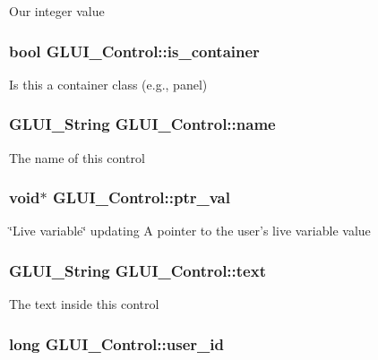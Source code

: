 Our integer value \hypertarget{classGLUI__Control_ac667bec4efbc9bdbf3e246b4471fb4cb}{
\subsubsection[{is\-\_\-container}]{\setlength{\rightskip}{0pt plus 5cm}bool G\-L\-U\-I\-\_\-\-Control\-::is\-\_\-container}}\label{classGLUI__Control_ac667bec4efbc9bdbf3e246b4471fb4cb}
Is this a container class (e.\-g., panel) \hypertarget{classGLUI__Control_aa95b97d50df45335fc33f0af03958eb3}{
\subsubsection[{name}]{\setlength{\rightskip}{0pt plus 5cm}G\-L\-U\-I\-\_\-\-String G\-L\-U\-I\-\_\-\-Control\-::name}}\label{classGLUI__Control_aa95b97d50df45335fc33f0af03958eb3}
The name of this control \hypertarget{classGLUI__Control_a0890ea809b8d980695939e1d92a0af47}{
\subsubsection[{ptr\-\_\-val}]{\setlength{\rightskip}{0pt plus 5cm}void$\ast$ G\-L\-U\-I\-\_\-\-Control\-::ptr\-\_\-val}}\label{classGLUI__Control_a0890ea809b8d980695939e1d92a0af47}
\char`\"{}\-Live variable\char`\"{} updating A pointer to the user's live variable value \hypertarget{classGLUI__Control_af0d60e9736f4dbc34e9a536e75876d72}{
\subsubsection[{text}]{\setlength{\rightskip}{0pt plus 5cm}G\-L\-U\-I\-\_\-\-String G\-L\-U\-I\-\_\-\-Control\-::text}}\label{classGLUI__Control_af0d60e9736f4dbc34e9a536e75876d72}
The text inside this control \hypertarget{classGLUI__Control_a6c88b7c72b0800f88a5d4cda4868c8b6}{
\subsubsection[{user\-\_\-id}]{\setlength{\rightskip}{0pt plus 5cm}long G\-L\-U\-I\-\_\-\-Control\-::user\-\_\-id}}\label{classGLUI__Control_a6c88b7c72b0800f88a5d4cda4868c8b6}


